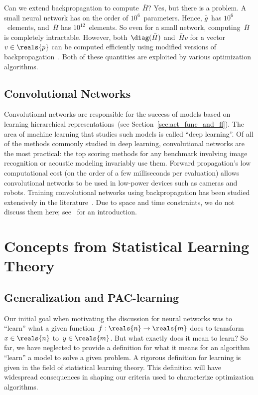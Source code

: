 \documentclass[11pt,a4paper]{article}
\numberwithin{equation}{section}
\begin{document}
Can we extend backpropagation to compute~$\bar{H}$? Yes, but there is a problem.
A small neural network has on the order of $10^6$~parameters. Hence,
$\bar{g}$~has $10^6$~elements, and~$\bar{H}$ has $10^{12}$~elements. So even for
a small network, computing~$\bar{H}$ is completely intractable. However,
both~$\diag(\bar{H})$ and~$\bar{H}v$ for a vector~$v \in \reals{p}$ can be
computed efficiently using modified versions of
backpropagation~\citep{ml_bishop}. Both of these quantities are exploited by
various optimization algorithms.

\subsection{Convolutional Networks}

Convolutional networks are responsible for the success of models based on
learning hierarchical representations~(see Section~\ref{sec:act_func_and_fl}).
The area of machine learning that studies such models is called ``deep
learning''. Of all of the methods commonly studied in deep learning,
convolutional networks are the most practical: the top scoring methods for any
benchmark involving image recognition or acoustic modeling invariably use them.
Forward propagation's low computational cost (on the order of a few milliseconds
per evaluation) allows convolutional networks to be used in low-power devices
such as cameras and robots. Training convolutional networks using
backpropagation has been studied extensively in the
literature~\citep{lecun-98b}. Due to space and time constraints, we do not
discuss them here; see~\citet{ufldl-website} for an introduction.

\section{Concepts from Statistical Learning Theory}
\label{src:concepts_from_slt}

\subsection{Generalization and PAC-learning}

Our initial goal when motivating the discussion for neural networks was to
``learn'' what a given function~$f: \reals{n} \to \reals{m}$ does to
transform~$x \in \reals{n}$ to~$y \in \reals{m}$. But what exactly does it mean
to learn? So far, we have neglected to provide a definition for what it means
for an algorithm ``learn'' a model to solve a given problem. A rigorous
definition for learning is given in the field of statistical learning theory.
This definition will have widespread consequences in shaping our criteria used
to characterize optimization algorithms.
\end{document}
